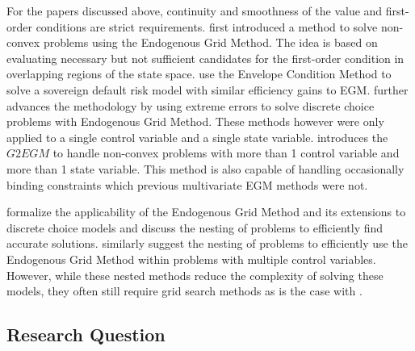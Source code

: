 \documentclass{article}
\begin{document}
For the papers discussed above, continuity and smoothness of the value and first-order conditions are strict requirements. \citet{Fella2014} first introduced a method to solve non-convex problems using the Endogenous Grid Method. The idea is based on evaluating necessary but not sufficient candidates for the first-order condition in overlapping regions of the state space. \citet{Arellano2016} use the Envelope Condition Method to solve a sovereign default risk model with similar efficiency gains to EGM. \citet{Iskhakov2017} further advances the methodology by using extreme errors to solve discrete choice problems with Endogenous Grid Method. These methods however were only applied to a single control variable and a single state variable. \citet{Druedahl2017} introduces the $G2EGM$ to handle non-convex problems with more than 1 control variable and more than 1 state variable. This method is also capable of handling occasionally binding constraints which previous multivariate EGM methods were not.

\citet{Clausen2020} formalize the applicability of the Endogenous Grid Method and its extensions to discrete choice models and discuss the nesting of problems to efficiently find accurate solutions. \citet{Druedahl2021} similarly suggest the nesting of problems to efficiently use the Endogenous Grid Method within problems with multiple control variables. However, while these nested methods reduce the complexity of solving these models, they often still require grid search methods as is the case with \citet{Druedahl2021}.


\subsection{Research Question}\label{Research Question}


\end{document}
